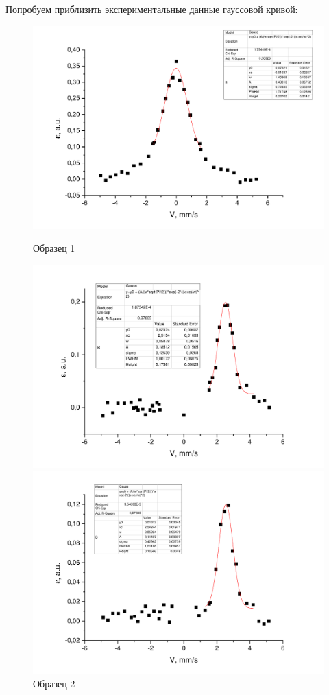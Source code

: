 \documentclass[a4paper,12pt]{article}
\begin{document}
	
	Попробуем приблизить экспериментальные данные гауссовой кривой:
	\begin{figure}[h!]
		\begin{center}
			\begin{minipage}{0.32\textwidth}
				\includegraphics[width=\textwidth]{sample1_g}
			\caption{Образец 1}
		\end{minipage}
		\hfill
		\begin{minipage}{0.32\textwidth}
			\includegraphics[width=\textwidth]{sample2_g}
			\caption{Образец 2}
		\end{minipage}
		\hfill
		\begin{minipage}{0.32\textwidth}
			\includegraphics[width=\textwidth]{sample4_g}

\end{minipage}
\end{center}
\end{figure}
\end{document}

